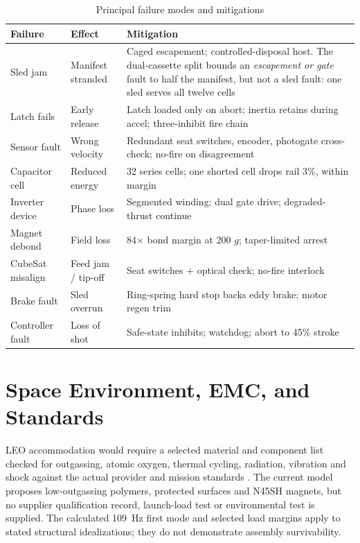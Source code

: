 \documentclass[conference]{IEEEtran}
\begin{document}
\begin{table}[t]
\caption{Principal failure modes and mitigations}
\label{tab:fmea}
\centering\footnotesize
\begin{tabular}{p{1.5cm}p{1.4cm}p{4.2cm}}
\toprule
Failure & Effect & Mitigation\\
\midrule
Sled jam & Manifest stranded & Caged escapement; controlled-disposal host. The dual-cassette split bounds an \emph{escapement or gate} fault to half the manifest, but not a sled fault: one sled serves all twelve cells\\
Latch fails & Early release & Latch loaded only on abort; inertia retains during accel; three-inhibit fire chain\\
Sensor fault & Wrong velocity & Redundant seat switches, encoder, photogate cross-check; no-fire on disagreement\\
Capacitor cell & Reduced energy & 32 series cells; one shorted cell drops rail 3\%, within margin\\
Inverter device & Phase loss & Segmented winding; dual gate drive; degraded-thrust continue\\
Magnet debond & Field loss & 84$\times$ bond margin at 200 $g$; taper-limited arrest\\
CubeSat misalign & Feed jam / tip-off & Seat switches + optical check; no-fire interlock\\
Brake fault & Sled overrun & Ring-spring hard stop backs eddy brake; motor regen trim\\
Controller fault & Loss of shot & Safe-state inhibits; watchdog; abort to 45\% stroke\\
\bottomrule
\end{tabular}
\end{table}

\section{Space Environment, EMC, and Standards}\label{sec:env}
LEO accommodation would require a selected material and component list checked for outgassing, atomic oxygen, thermal cycling, radiation, vibration and shock against the actual provider and mission standards \cite{ecss}. The current model proposes low-outgassing polymers, protected surfaces and N45SH magnets, but no supplier qualification record, launch-load test or environmental test is supplied. The calculated 109~Hz first mode and selected load margins apply to stated structural idealizations; they do not demonstrate assembly survivability.
\end{document}
